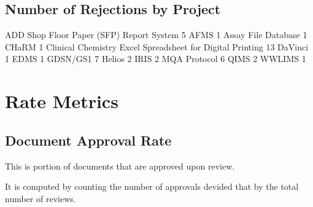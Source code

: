 \documentclass{article}
\begin{document}
\subsection{Number of Rejections by Project}

\begin{Schunk}
\begin{Soutput}
                 ADD Shop Floor Paper (SFP) Report System 
                                                        5 
                                                     AFMS 
                                                        1 
                                      Assay File Database 
                                                        1 
                                                    CHaRM 
                                                        1 
Clinical Chemistry Excel Spreadsheet for Digital Printing 
                                                       13 
                                                  DaVinci 
                                                        1 
                                                     EDMS 
                                                        1 
                                                 GDSN/GS1 
                                                        7 
                                                   Helios 
                                                        2 
                                                     IRIS 
                                                        2 
                                             MQA Protocol 
                                                        6 
                                                     QIMS 
                                                        2 
                                                   WWLIMS 
                                                        1 
\end{Soutput}
\end{Schunk}



\section{Rate Metrics}
\subsection{Document Approval Rate}
This is portion of documents that are approved upon review.

It is computed by counting the number of approvals devided that by the total number of reviews.
\end{document}
